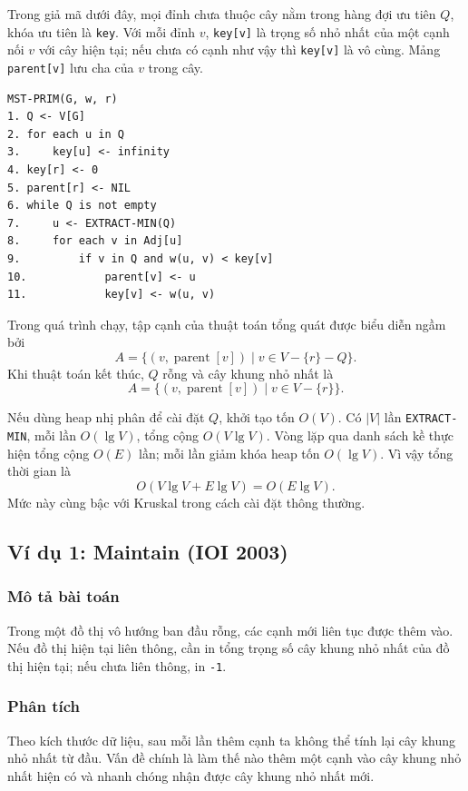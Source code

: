 \documentclass[11pt]{article}
\begin{document}
Trong giả mã dưới đây, mọi đỉnh chưa thuộc cây nằm trong hàng đợi ưu tiên
$Q$, khóa ưu tiên là \texttt{key}. Với mỗi đỉnh $v$, \texttt{key[v]} là trọng
số nhỏ nhất của một cạnh nối $v$ với cây hiện tại; nếu chưa có cạnh như vậy
thì \texttt{key[v]} là vô cùng. Mảng \texttt{parent[v]} lưu cha của $v$ trong
cây.

\begin{verbatim}
MST-PRIM(G, w, r)
1. Q <- V[G]
2. for each u in Q
3.     key[u] <- infinity
4. key[r] <- 0
5. parent[r] <- NIL
6. while Q is not empty
7.     u <- EXTRACT-MIN(Q)
8.     for each v in Adj[u]
9.         if v in Q and w(u, v) < key[v]
10.            parent[v] <- u
11.            key[v] <- w(u, v)
\end{verbatim}

Trong quá trình chạy, tập cạnh của thuật toán tổng quát được biểu diễn ngầm
bởi
\[
  A=\{(v,\operatorname{parent}[v])\mid v\in V-\{r\}-Q\}.
\]
Khi thuật toán kết thúc, $Q$ rỗng và cây khung nhỏ nhất là
\[
  A=\{(v,\operatorname{parent}[v])\mid v\in V-\{r\}\}.
\]

Nếu dùng heap nhị phân để cài đặt $Q$, khởi tạo tốn $O(V)$. Có $|V|$ lần
\texttt{EXTRACT-MIN}, mỗi lần $O(\lg V)$, tổng cộng $O(V\lg V)$. Vòng lặp qua
danh sách kề thực hiện tổng cộng $O(E)$ lần; mỗi lần giảm khóa heap tốn
$O(\lg V)$. Vì vậy tổng thời gian là
\[
  O(V\lg V+E\lg V)=O(E\lg V).
\]
Mức này cùng bậc với Kruskal trong cách cài đặt thông thường.

\subsection{Ví dụ 1: Maintain (IOI 2003)}

\subsubsection*{Mô tả bài toán}

Trong một đồ thị vô hướng ban đầu rỗng, các cạnh mới liên tục được thêm vào.
Nếu đồ thị hiện tại liên thông, cần in tổng trọng số cây khung nhỏ nhất của
đồ thị hiện tại; nếu chưa liên thông, in \texttt{-1}.

\subsubsection*{Phân tích}

Theo kích thước dữ liệu, sau mỗi lần thêm cạnh ta không thể tính lại cây
khung nhỏ nhất từ đầu. Vấn đề chính là làm thế nào thêm một cạnh vào cây khung
nhỏ nhất hiện có và nhanh chóng nhận được cây khung nhỏ nhất mới.
\end{document}
